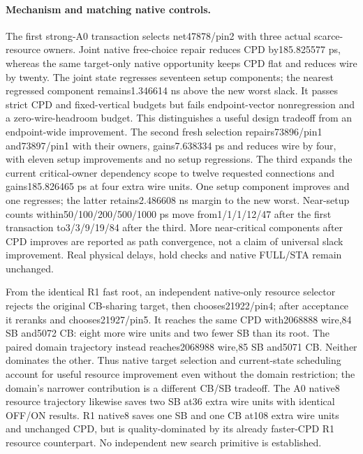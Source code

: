 \paragraph{Mechanism and matching native controls.}
The first strong-A0 transaction selects net47878/pin2 with three actual scarce-resource owners. Joint native free-choice repair reduces CPD by185.825577 ps, whereas the same target-only native opportunity keeps CPD flat and reduces wire by twenty. The joint state regresses seventeen setup components; the nearest regressed component remains1.346614 ns above the new worst slack. It passes strict CPD and fixed-vertical budgets but fails endpoint-vector nonregression and a zero-wire-headroom budget. This distinguishes a useful design tradeoff from an endpoint-wide improvement. The second fresh selection repairs73896/pin1 and73897/pin1 with their owners, gains7.638334 ps and reduces wire by four, with eleven setup improvements and no setup regressions. The third expands the current critical-owner dependency scope to twelve requested connections and gains185.826465 ps at four extra wire units. One setup component improves and one regresses; the latter retains2.486608 ns margin to the new worst. Near-setup counts within50/100/200/500/1000 ps move from1/1/1/12/47 after the first transaction to3/3/9/19/84 after the third. More near-critical components after CPD improves are reported as path convergence, not a claim of universal slack improvement. Real physical delays, hold checks and native FULL/STA remain unchanged.

From the identical R1 fast root, an independent native-only resource selector rejects the original CB-sharing target, then chooses21922/pin4; after acceptance it reranks and chooses21927/pin5. It reaches the same CPD with2068888 wire,84 SB and5072 CB: eight more wire units and two fewer SB than its root. The paired domain trajectory instead reaches2068988 wire,85 SB and5071 CB. Neither dominates the other. Thus native target selection and current-state scheduling account for useful resource improvement even without the domain restriction; the domain's narrower contribution is a different CB/SB tradeoff. The A0 native8 resource trajectory likewise saves two SB at36 extra wire units with identical OFF/ON results. R1 native8 saves one SB and one CB at108 extra wire units and unchanged CPD, but is quality-dominated by its already faster-CPD R1 resource counterpart. No independent new search primitive is established.

